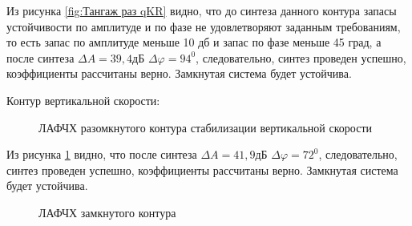 Из рисунка \ref{fig:Тангаж раз qKR} видно, что до синтеза данного контура запасы устойчивости по амплитуде и по фазе не удовлетворяют заданным требованиям, то есть запас по амплитуде меньше 10 дб и запас по фазе меньше 45 град, а после синтеза $\Delta A = 39,4 $дБ $\Delta \varphi = 94^0$, следовательно, синтез проведен успешно, коэффициенты рассчитаны верно. Замкнутая система будет устойчива.  

\begin{center}
    Контур вертикальной скорости:
\end{center}

\begin{figure}[H]
    \caption{ЛАФЧХ разомкнутого контура стабилизации вертикальной скорости}
    \label{fig:Вертикальная скорость раз qKR}
\end{figure}

Из рисунка \ref{fig:Вертикальная скорость раз qKR} видно, что после синтеза $\Delta A = 41,9 $дБ $\Delta \varphi = 72^0$, следовательно, синтез проведен успешно, коэффициенты рассчитаны верно. Замкнутая система будет устойчива.  

\begin{figure}[H]
    \caption{ЛАФЧХ замкнутого контура }
    \label{fig:Вертикальная скорость зам qKR}
\end{figure}

